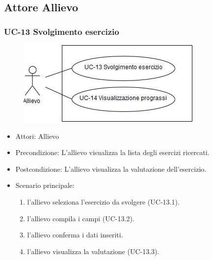 \newpage


					
					
					
\subsection{Attore Allievo}
	\subsubsection{UC-13 Svolgimento esercizio}
	\begin{figure}[h]
			\centering
			\includegraphics[scale=0.7]{images/UC-13.png}
	\end{figure}	
	\begin{itemize}
	\item Attori: Allievo
			\item Precondizione:  L'allievo visualizza la lista degli esercizi ricercati.
			\item Postcondizione: L'allievo visualizza la valutazione dell'esercizio.
			\item Scenario principale:
			\begin{enumerate}
				\item l'allievo seleziona l'esercizio da svolgere (UC-13.1).
				\item l'allievo compila i campi (UC-13.2).
				\item l'allievo conferma i dati inseriti.
				\item l'allievo visualizza la valutazione (UC-13.3).
			\end{enumerate}
	\end{itemize}
			
